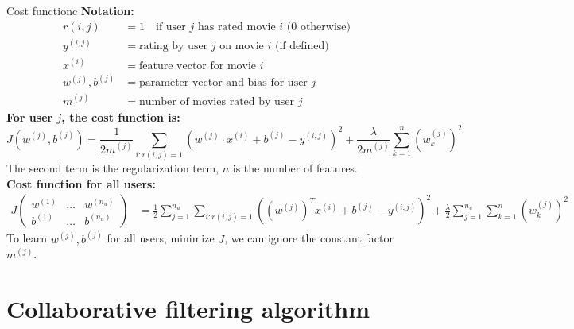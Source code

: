 \begin{dfnbox}{Cost function}{c}
    \textbf{Notation:}
    \begin{align*}
        r(i, j) &= 1 \quad \text{if user $j$ has rated movie $i$ (0 otherwise)}\\
        y^{(i, j)} &= \text{rating by user $j$ on movie $i$ (if defined)}\\
        x^{(i)} &= \text{feature vector for movie $i$}\\
        w^{(j)}, b^{(j)} &= \text{parameter vector and bias for user $j$}\\
        m^{(j)} &= \text{number of movies rated by user $j$}
    \end{align*}
    \textbf{For user $j$, the cost function is:}
    \begin{equation}
        J(w^{(j)}, b^{(j)}) = \frac{1}{2m^{(j)}} \sum_{i:r(i,j)=1} \left( w^{(j)} \cdot x^{(i)} + b^{(j)} - y^{(i,j)} \right)^2 + 
        \frac{\lambda}{2m^{(j)}} \sum_{k=1}^{n} (w_k^{(j)})^2
    \end{equation}
    \hspace{2em}The second term is the regularization term, $n$ is the number of features.\\
    \textbf{Cost function for all users:}\\
    \begin{align}
        J\left(\begin{matrix} w^{(1)} & \ldots & w^{(n_u)}\\ b^{(1)} & \ldots & b^{(n_u)} \end{matrix}\right) &= 
        \frac{1}{2} \sum_{j=1}^{n_u} \sum_{i:r(i,j)=1}
         \left( (w^{(j)})^T x^{(i)} + b^{(j)} - y^{(i,j)} \right)^2 + 
         \frac{\lambda}{2} \sum_{j=1}^{n_u} \sum_{k=1}^{n} (w_k^{(j)})^2
    \end{align}
    \hspace{2em}To learn $w^{(j)}, b^{(j)}$ for all users, minimize $J$, we can ignore the constant factor $m^{(j)}$.
\end{dfnbox}

\section{Collaborative filtering algorithm}
